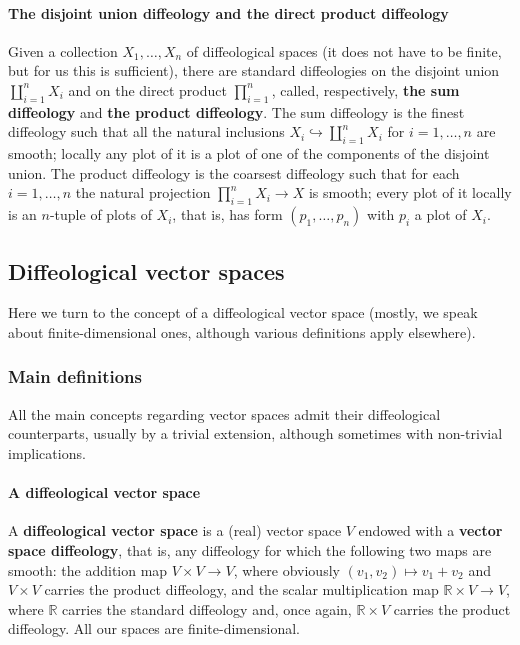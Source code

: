 \documentclass{article}
\newcommand\matR{{\mathbb{R}}}
\begin{document}
\paragraph{The disjoint union diffeology and the direct product diffeology} Given a collection $X_1,\ldots,X_n$ of diffeological spaces (it does not have to be finite, but for us this is sufficient), there are standard 
diffeologies on the disjoint union $\coprod_{i=1}^nX_i$ and on the direct product $\prod_{i=1}^n$, called, respectively, \textbf{the sum diffeology} and \textbf{the product diffeology}. The sum diffeology is the 
finest diffeology such that all the natural inclusions $X_i\hookrightarrow\coprod_{i=1}^nX_i$ for $i=1,\ldots,n$ are smooth; locally any plot of it is a plot of one of the components of the disjoint union. The 
product diffeology is the coarsest diffeology such that for each $i=1,\ldots,n$ the natural projection $\prod_{i=1}^nX_i\to X$ is smooth; every plot of it locally is an $n$-tuple of plots of $X_i$, that is, has form 
$(p_1,\ldots,p_n)$ with $p_i$ a plot of $X_i$.


\subsection{Diffeological vector spaces}

Here we turn to the concept of a diffeological vector space (mostly, we speak about finite-dimensional ones, although various definitions apply elsewhere).

\subsubsection{Main definitions}

All the main concepts regarding vector spaces admit their diffeological counterparts, usually by a trivial extension, although sometimes with non-trivial implications.

\paragraph{A diffeological vector space} A \textbf{diffeological vector space} is a (real) vector space $V$ endowed with a \textbf{vector space diffeology}, that is, any diffeology for which the following two maps 
are smooth: the addition map $V\times V\to V$, where obviously $(v_1,v_2)\mapsto v_1+v_2$ and $V\times V$ carries the product diffeology, and the scalar multiplication map $\matR\times V\to V$, where 
$\matR$ carries the standard diffeology and, once again, $\matR\times V$ carries the product diffeology. All our spaces are finite-dimensional.
\end{document}

